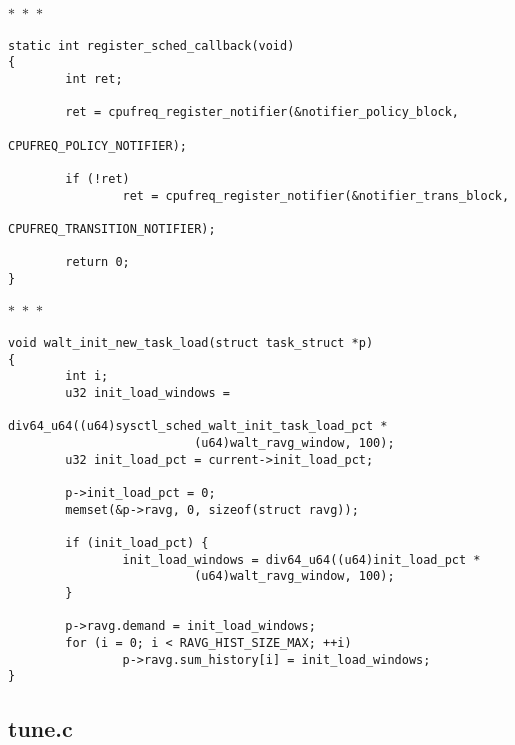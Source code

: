 \documentclass{article}
\newcommand{\divider}{{\begin{center}
  $\ast$~$\ast$~$\ast$
\end{center}}}
\begin{document}
\divider
\begin{verbatim}
static int register_sched_callback(void)
{
        int ret;

        ret = cpufreq_register_notifier(&notifier_policy_block,
                                                CPUFREQ_POLICY_NOTIFIER);

        if (!ret)
                ret = cpufreq_register_notifier(&notifier_trans_block,
                                                CPUFREQ_TRANSITION_NOTIFIER);

        return 0;
}
\end{verbatim}
\divider
\begin{verbatim}
void walt_init_new_task_load(struct task_struct *p)
{
        int i;
        u32 init_load_windows =
                        div64_u64((u64)sysctl_sched_walt_init_task_load_pct *
                          (u64)walt_ravg_window, 100);
        u32 init_load_pct = current->init_load_pct;

        p->init_load_pct = 0;
        memset(&p->ravg, 0, sizeof(struct ravg));

        if (init_load_pct) {
                init_load_windows = div64_u64((u64)init_load_pct *
                          (u64)walt_ravg_window, 100);
        }

        p->ravg.demand = init_load_windows;
        for (i = 0; i < RAVG_HIST_SIZE_MAX; ++i)
                p->ravg.sum_history[i] = init_load_windows;
}
\end{verbatim}



\subsection{tune.c}
\end{document}
